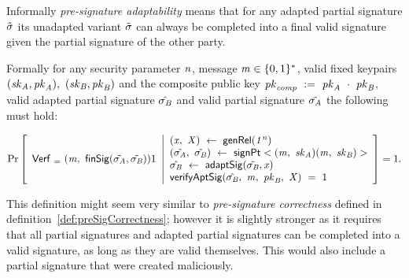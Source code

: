 \begin{definition}
    Informally \textit{pre-signature adaptability} means that for any adapted partial signature $\hat{\sigma}$ its unadapted variant $\tilde{\sigma}$ can always be completed into a final valid signature given the partial signature of the other party.

    Formally for any security parameter $\mathit{n}$, message $\mathit{m} \in \{0,1\}^{*}$, valid fixed keypairs $(\mathit{sk}_{\mathit{A}}, \mathit{pk}_{\mathit{A}}) ,~ (\mathit{sk}_{\mathit{B}}, \mathit{pk}_{\mathit{B}})$ and the composite public key $\mathit{pk}_{\mathit{comp}} ~:=~ \mathit{pk}_{\mathit{A}} ~\cdot~ \mathit{pk}_{\mathit{B}}$,
    valid adapted partial signature $\hat{\sigma_{\mathit{B}}}$ and valid partial signature $\tilde{\sigma_{\mathit{A}}}$ the following must hold:
    \begin{scriptsize}
        \[
            \Pr\left[
            \begin{array}{c}
                \mathsf{Verf}_{~=~}(\mathit{m} ,~ \mathsf{finSig}(\tilde{\sigma_{\mathit{A}}},\tilde{\sigma_{\mathit{B}}})) 1
            \end{array}
            \middle\vert
            \begin{array}{l}
                (\mathit{x} ,~ \mathit{X}) ~\leftarrow~ \mathsf{genRel}(\mathit{1^n}) \\
                (\tilde{\sigma_{\mathit{A}}} ,~ \tilde{\sigma_{\mathit{B}}}) ~\leftarrow~ \mathsf{signPt}<(\mathit{m} ,~ \mathit{sk}_{\mathit{A}})(\mathit{m} ,~ \mathit{sk}_{\mathit{B}})> \\
                \hat{\sigma_{\mathit{B}}} ~\leftarrow~ \mathsf{adaptSig}(\tilde{\sigma_{\mathit{B}}},\mathit{x}) \\
                \mathsf{verifyAptSig}(\hat{\sigma_{\mathit{B}}} ,~ \mathit{m} ,~ \mathit{pk}_{\mathit{B}} ,~ \mathit{X}) ~=~ 1 \\
            \end{array}
            \right]=1.
        \]
    \end{scriptsize}
    This definition might seem very similar to \textit{pre-signature correctness} defined in definition~\ref{def:preSigCorrectness}; however it is slightly stronger as it requires that all partial signatures and adapted partial signatures can be completed
    into a valid signature, as long as they are valid themselves. This would also include a partial signature that were created maliciously.
\end{definition}

